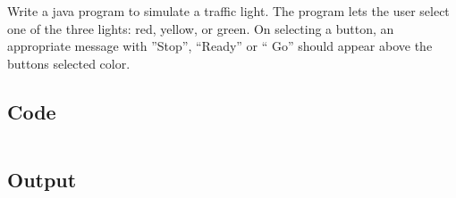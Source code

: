 \documentclass[../main.tex]{subfiles}
\begin{document}
Write a java program to simulate a traffic light. The program lets the user
select one of the three lights: red, yellow, or green. On selecting a button,
an appropriate message with ”Stop”, “Ready” or “ Go” should appear above the
buttons selected color.

\subsection{Code}
\inputminted[frame=lines, breaklines, breakanywhere, numberblanklines=false]{java}{./programs/prog13/Traffic.java}

\subsection{Output}
\end{document}
